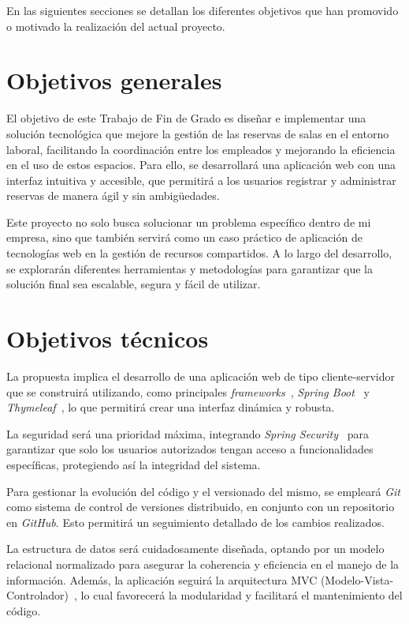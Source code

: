
En las siguientes secciones se detallan los diferentes objetivos que han promovido o motivado la realización del actual proyecto.

\section{Objetivos generales}\label{objetivos-generales}
El objetivo de este Trabajo de Fin de Grado es diseñar e implementar una solución tecnológica que mejore la gestión de las reservas de salas en el entorno laboral, facilitando la coordinación entre los empleados y mejorando la eficiencia en el uso de estos espacios. Para ello, se desarrollará una aplicación web con una interfaz intuitiva y accesible, que permitirá a los usuarios registrar y administrar reservas de manera ágil y sin ambigüedades.

Este proyecto no solo busca solucionar un problema específico dentro de mi empresa, sino que también servirá como un caso práctico de aplicación de tecnologías web en la gestión de recursos compartidos. A lo largo del desarrollo, se explorarán diferentes herramientas y metodologías para garantizar que la solución final sea escalable, segura y fácil de utilizar.

\section{Objetivos técnicos}\label{objetivos-tecnicos}
La propuesta implica el desarrollo de una aplicación web de tipo cliente-servidor~\cite{client-server-model} que se construirá utilizando, como principales \emph{frameworks}~\cite{framework}, \textit{Spring Boot}~\cite{spring-boot} y \textit{Thymeleaf}~\cite{thymeleaf}, lo que permitirá crear una interfaz dinámica y robusta.

La seguridad será una prioridad máxima, integrando \textit{Spring Security}~\cite{spring-security} para garantizar que solo los usuarios autorizados tengan acceso a funcionalidades específicas, protegiendo así la integridad del sistema.

Para gestionar la evolución del código y el versionado del mismo, se empleará \textit{Git} como sistema de control de versiones distribuido, en conjunto con un repositorio en \textit{GitHub}. Esto permitirá un seguimiento detallado de los cambios realizados.

La estructura de datos será cuidadosamente diseñada, optando por un modelo relacional normalizado para asegurar la coherencia y eficiencia en el manejo de la información. Además, la aplicación seguirá la arquitectura MVC (Modelo-Vista-Controlador)~\cite{modelo-vista-controrlador}, lo cual favorecerá la modularidad y facilitará el mantenimiento del código.

